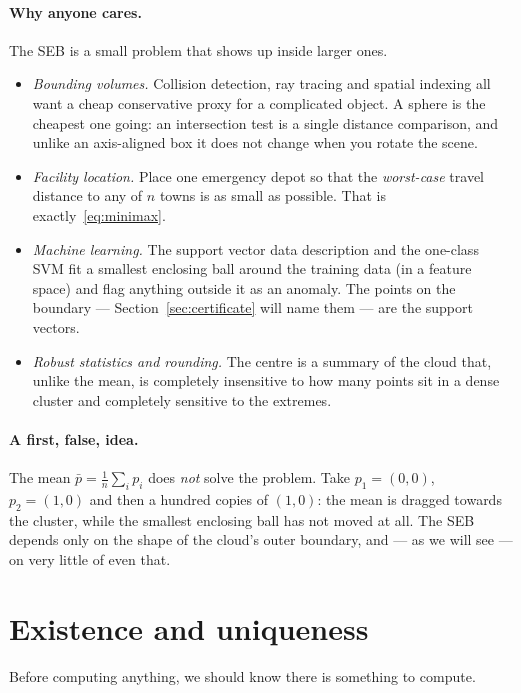 \documentclass[11pt,a4paper]{article}
\theoremstyle{plain}
\theoremstyle{definition}
\theoremstyle{remark}
\begin{document}
\paragraph{Why anyone cares.} The SEB is a small problem that shows up inside
larger ones.
\begin{itemize}
  \item \emph{Bounding volumes.} Collision detection, ray tracing and spatial
    indexing all want a cheap conservative proxy for a complicated object. A
    sphere is the cheapest one going: an intersection test is a single distance
    comparison, and unlike an axis-aligned box it does not change when you rotate
    the scene.
  \item \emph{Facility location.} Place one emergency depot so that the
    \emph{worst-case} travel distance to any of $n$ towns is as small as
    possible. That is exactly~\eqref{eq:minimax}.
  \item \emph{Machine learning.} The support vector data description and the
    one-class SVM fit a smallest enclosing ball around the training data (in a
    feature space) and flag anything outside it as an anomaly. The points on the
    boundary --- Section~\ref{sec:certificate} will name them --- are the support
    vectors.
  \item \emph{Robust statistics and rounding.} The centre is a summary of the
    cloud that, unlike the mean, is completely insensitive to how many points sit
    in a dense cluster and completely sensitive to the extremes.
\end{itemize}

\paragraph{A first, false, idea.} The mean $\bar p = \frac1n\sum_i p_i$ does
\emph{not} solve the problem. Take $p_1=(0,0)$, $p_2=(1,0)$ and then a hundred
copies of $(1,0)$: the mean is dragged towards the cluster, while the smallest
enclosing ball has not moved at all. The SEB depends only on the shape of the
cloud's outer boundary, and --- as we will see --- on very little of even that.

\section{Existence and uniqueness}
\label{sec:existence}

Before computing anything, we should know there is something to compute.
\end{document}
